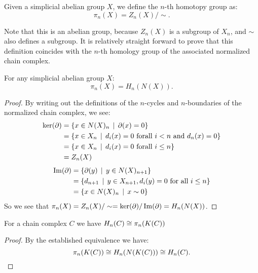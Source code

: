 

\begin{definition}
	Given a simplicial abelian group $X$, we define the $n$-th homotopy group as:
	$$ \pi_n(X) = Z_n(X) / \sim. $$
\end{definition}

Note that this is an abelian group, because $Z_n(X)$ is a subgroup of $X_n$, and $\sim$ also defines a subgroup. It is relatively straight forward to prove that this definition coincides with the $n$-th homology group of the associated normalized chain complex.

\begin{lemma}
	For any simplicial abelian group $X$:
	$$ \pi_n(X) = H_n(N(X)). $$
\end{lemma}
\begin{proof}
	By writing out the definitions of the $n$-cycles and $n$-boundaries of the normalized chain complex, we see:
	\begin{align*}
		\ker(\partial) &= \{ x \in N(X)_n \,\mid\, \partial(x) = 0 \} \\
			&= \{ x \in X_n \,\mid\, d_i(x) = 0 \text{ forall } i < n \text{ and } d_n(x) = 0 \} \\
			&= \{ x \in X_n \,\mid\, d_i(x) = 0 \text{ forall } i \leq n \} \\
			&= Z_n(X)
	\end{align*}
	\begin{align*}
		\operatorname{Im}(\partial) &= \{ \partial(y) \,\mid\, y \in N(X)_{n+1} \} \\
			&= \{ d_{n+1} \,\mid\, y \in X_{n+1}, d_i(y) = 0 \text{ for all } i \leq n \} \\
			&= \{ x \in N(X)_n \,\mid\, x \sim 0 \}
	\end{align*}
	So we see that $\pi_n(X) = Z_n(X) / \sim = \ker(\partial) / \operatorname{Im}(\partial) = H_n(N(X))$.
\end{proof}

\begin{corollary}
	For a chain complex $C$ we have $H_n(C) \cong \pi_n(K(C))$
\end{corollary}
\begin{proof}
	By the established equivalence we have:
	$$ \pi_n(K(C)) \cong H_n(N(K(C))) \cong H_n(C). $$
\end{proof}


